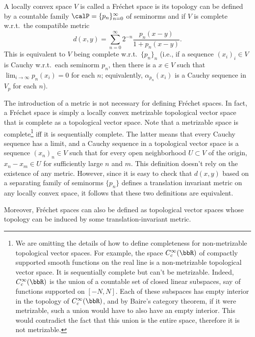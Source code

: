 \begin{defn}
    A locally convex space $V$ is called a Fr\'echet space is its topology can be defined by a countable family $\calP=\{p_n\}_{n=0}^\infty$ of seminorms and if $V$ is complete w.r.t.\ the compatible metric
    \[d(x,y)=\sum_{n=0}^\infty 2^{-n}\frac{p_n(x-y)}{1+p_n(x-y)}.\]
    This is equivalent to $V$ being complete w.r.t.\ $\{p_n\}_n$ (i.e., if a sequence $(x_i)_i\in V$ is Cauchy w.r.t.\ each seminorm $p_n$, then there is a $x\in V$ such that $\lim_{i\to\infty} p_n(x_i)=0$ for each $n$; equivalently, $\alpha_{p_n}(x_i)$ is a Cauchy sequence in $V_p$ for each $n$).
\end{defn}
\begin{rem}
    The introduction of a metric is not necessary for defining Fr\'echet spaces. In fact, a Fr\'echet space is simply a locally convex metrizable topological vector space that is complete as a topological vector space. Note that a metrizable space is complete\footnote{We are omitting the details of how to define completeness for non-metrizable topological vector spaces. For example, the space $C^\infty_c(\bbR)$ of compactly supported smooth functions on the real line is a non-metrizable topological vector space. It is sequentially complete but can't be metrizable. Indeed, $C^\infty_c(\bbR)$ is the union of a countable set of closed linear subspaces, say of functions supported on $[-N,N]$. Each of these subspaces has empty interior in the topology of $C^\infty_c(\bbR)$, and by Baire's category theorem, if it were metrizable, such a union would have to also have an empty interior. This would contradict the fact that this union is the entire space, therefore it is not metrizable.} iff it is sequentially complete. The latter means that every Cauchy sequence has a limit, and a Cauchy sequence in a topological vector space is a sequence $(x_n)_n\in V$ such that for every open neighborhood $U\subset V$ of the origin, $x_n-x_m\in U$ for sufficiently large $n$ and $m$. This definition doesn't rely on the existence of any metric. However, since it is easy to check that $d(x,y)$ based on a separating family of seminorms $\{p_n\}$ defines a translation invariant metric on any locally convex space, it follows that these two definitions are equivalent. 
    
    Moreover, Fr\'echet spaces can also be defined as topological vector spaces whose topology can be induced by some translation-invariant metric.
\end{rem}

